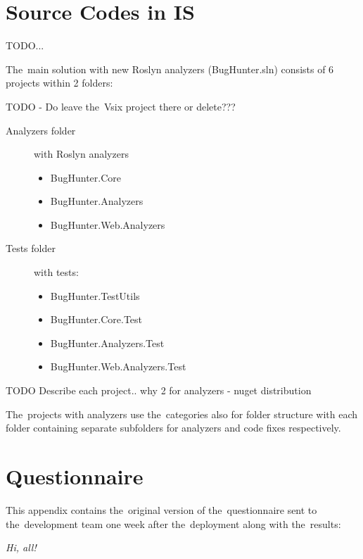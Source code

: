 \documentclass[
  digital, %
  table,   %
  lof,     %
  lot,     %
  oneside,
]{fithesis3}
\begin{document}
\chapter{Source Codes in IS}
\label{appendix:source-codes}
TODO...

The~main solution with new Roslyn analyzers (BugHunter.sln) consists of 6 projects within 2 folders: 

TODO - Do leave the~Vsix project there or delete???

\begin{description}
  \item[Analyzers folder] with Roslyn analyzers
  \begin{itemize}
    \item BugHunter.Core
    \item BugHunter.Analyzers
    \item BugHunter.Web.Analyzers
  \end{itemize}
  
  \item[Tests folder] with tests:
  \begin{itemize}
    \item BugHunter.TestUtils
    \item BugHunter.Core.Test
    \item BugHunter.Analyzers.Test
    \item BugHunter.Web.Analyzers.Test
  \end{itemize}
\end{description}

TODO Describe each project.. why 2 for analyzers - nuget distribution

The~projects with analyzers use the~categories also for folder structure with each folder containing separate subfolders for analyzers and code fixes respectively.

\chapter{Questionnaire}
\label{appendix:questionnaire}
This appendix contains the~original version of the~questionnaire sent to the~development team one week after the~deployment along with the~results:

\bigskip\noindent
\textit{Hi, all!}
\end{document}
